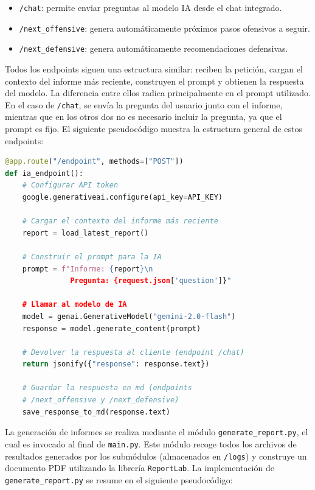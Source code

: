 \begin{parskipenv}
\begin{itemize}
    \item \texttt{/chat}: permite enviar preguntas al modelo IA desde el chat integrado.
    \item \texttt{/next\_offensive}: genera automáticamente próximos pasos ofensivos a seguir.
    \item \texttt{/next\_defensive}: genera automáticamente recomendaciones defensivas.
\end{itemize}

Todos los endpoints siguen una estructura similar: reciben la petición, cargan el contexto del informe más reciente, construyen el prompt y obtienen la respuesta del modelo. La diferencia entre ellos radica principalmente en el prompt utilizado. En el caso de \texttt{/chat}, se envía la pregunta del usuario junto con el informe, mientras que en los otros dos no es necesario incluir la pregunta, ya que el prompt es fijo. El siguiente pseudocódigo muestra la estructura general de estos endpoints:

\begin{lstlisting}[language=Python, caption={Estructura general de los endpoints de IA}]
@app.route("/endpoint", methods=["POST"])
def ia_endpoint():
    # Configurar API token
    google.generativeai.configure(api_key=API_KEY)

    # Cargar el contexto del informe más reciente
    report = load_latest_report()

    # Construir el prompt para la IA
    prompt = f"Informe: {report}\n
               Pregunta: {request.json['question']}"

    # Llamar al modelo de IA
    model = genai.GenerativeModel("gemini-2.0-flash")
    response = model.generate_content(prompt)

    # Devolver la respuesta al cliente (endpoint /chat)
    return jsonify({"response": response.text})

    # Guardar la respuesta en md (endpoints
    # /next_offensive y /next_defensive)
    save_response_to_md(response.text)
\end{lstlisting}

\medskip

La generación de informes se realiza mediante el módulo \texttt{generate\_report.py}, el cual es invocado al final de \texttt{main.py}. Este módulo recoge todos los archivos de resultados generados por los submódulos (almacenados en \texttt{/logs}) y construye un documento PDF utilizando la librería \texttt{ReportLab}. La implementación de \texttt{generate\_report.py} se resume en el siguiente pseudocódigo:


\end{parskipenv}

